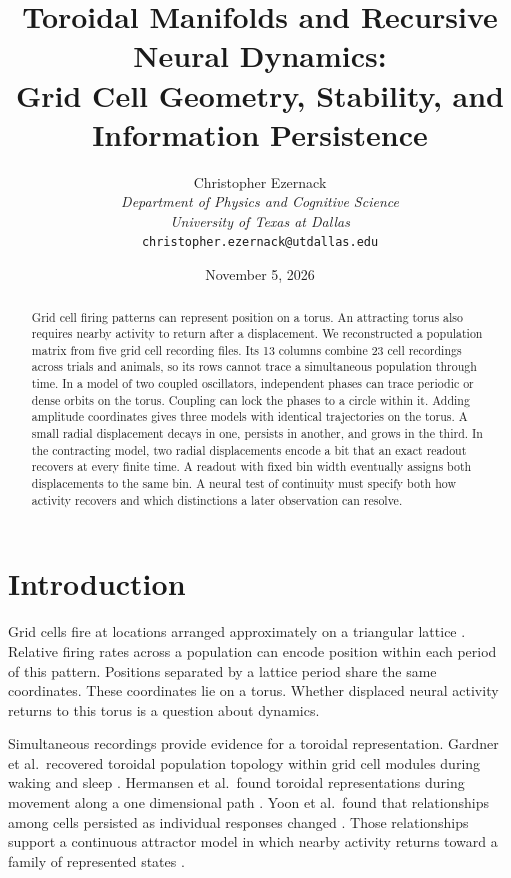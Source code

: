 \documentclass[12pt,a4paper]{article}
\title{\Large\textbf{Toroidal Manifolds and Recursive Neural Dynamics:\\Grid Cell Geometry, Stability, and Information Persistence}}
\author{Christopher Ezernack\\
\textit{Department of Physics and Cognitive Science}\\
\textit{University of Texas at Dallas}\\
\texttt{christopher.ezernack@utdallas.edu}}
\date{November 5, 2026}
\begin{document}
\maketitle
\thispagestyle{fancy}

\begin{abstract}
\singlespacing
Grid cell firing patterns can represent position on a torus. An attracting torus also requires nearby activity to return after a displacement. We reconstructed a population matrix from five grid cell recording files. Its 13 columns combine 23 cell recordings across trials and animals, so its rows cannot trace a simultaneous population through time. In a model of two coupled oscillators, independent phases can trace periodic or dense orbits on the torus. Coupling can lock the phases to a circle within it. Adding amplitude coordinates gives three models with identical trajectories on the torus. A small radial displacement decays in one, persists in another, and grows in the third. In the contracting model, two radial displacements encode a bit that an exact readout recovers at every finite time. A readout with fixed bin width eventually assigns both displacements to the same bin. A neural test of continuity must specify both how activity recovers and which distinctions a later observation can resolve.

\end{abstract}

\newpage
\section{Introduction}\label{sec:intro}

Grid cells fire at locations arranged approximately on a triangular lattice \cite{Hafting2005}. Relative firing rates across a population can encode position within each period of this pattern. Positions separated by a lattice period share the same coordinates. These coordinates lie on a torus. Whether displaced neural activity returns to this torus is a question about dynamics.

Simultaneous recordings provide evidence for a toroidal representation. Gardner et al.\ recovered toroidal population topology within grid cell modules during waking and sleep \cite{Gardner2022}. Hermansen et al.\ found toroidal representations during movement along a one dimensional path \cite{Hermansen2024}. Yoon et al.\ found that relationships among cells persisted as individual responses changed \cite{Yoon2013}. Those relationships support a continuous attractor model in which nearby activity returns toward a family of represented states \cite{Wu2016}.
\end{document}
